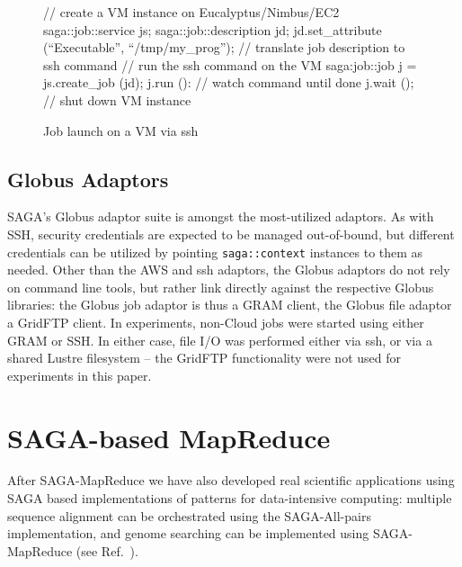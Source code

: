 \documentclass[conference,final]{IEEEtran}
\newcommand{\sagamapreduce }{SAGA-MapReduce }
\newcommand{\upup}{\vspace*{-0.6em}}
\newcommand{\upp}{\vspace*{-0.6em}}
\newcommand{\T}[1]{\texttt{#1}}
\begin{document}
\begin{figure}[!ht]
\upp
 \begin{center}
  \begin{mycode}[label=SAGA create a VM instance on a Cloud]
   {// create a VM instance on Eucalyptus/Nimbus/EC2
    saga::job::service     js;
    saga::job::description jd;
    jd.set_attribute (``Executable'', ``/tmp/my_prog'');
    // translate job description to ssh command
    // run the ssh command on the VM
    saga:job::job j = js.create_job (jd);
    j.run ():
    // watch command until done
    j.wait ();
   } // shut down VM instance
  \end{mycode}
  \caption{\label{vmjob} Job launch on a VM via ssh\vspace*{-2em}}
 \end{center}
\upp
\end{figure}

\upup
\upup
\subsection{Globus Adaptors}
SAGA's Globus adaptor suite is amongst the most-utilized adaptors.  As
with SSH, security credentials are expected to be managed
out-of-bound, but different credentials can be utilized by pointing
\T{saga::context} instances to them as needed.  Other than the AWS and
ssh adaptors, the Globus adaptors do not rely on command line tools,
but rather link directly against the respective Globus libraries: the
Globus job adaptor is thus a GRAM client, the Globus file adaptor a
GridFTP client.  In experiments, non-Cloud jobs were started using
either GRAM or SSH.  In either case, file I/O was performed either via
ssh, or via a shared Lustre filesystem -- the GridFTP functionality
were not used for experiments in this paper.

\upup
\section{SAGA-based MapReduce}
After \sagamapreduce we have also developed real scientific
applications using SAGA based implementations of patterns for
data-intensive computing: multiple sequence alignment can be
orchestrated using the SAGA-All-pairs implementation, and genome
searching can be implemented using SAGA-MapReduce (see
Ref.~\cite{saga_ccgrid09}).


\upup
\end{document}
